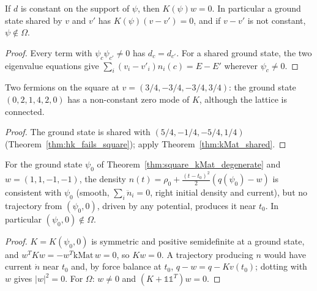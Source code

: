 \begin{theorem}
  \label{thm:kMat_shared}
  \leanok
  If $d$ is constant on the support of $\psi$, then $K(\psi)w=0$. In particular a ground state shared by $v$
  and $v'$ has $K(\psi)(v-v')=0$, and if $v-v'$ is not constant, $\psi\notin\Omega$.
\end{theorem}
\begin{proof}
  \leanok
  Every term with $\psi_c\psi_{c'}\ne0$ has $d_c=d_{c'}$. For a shared ground state, the two eigenvalue
  equations give $\sum_i(v_i-v'_i)n_i(c)=E-E'$ wherever $\psi_c\ne0$.
\end{proof}

\begin{theorem}
  \label{thm:square_kMat_degenerate}
  \leanok
  Two fermions on the square at $v=(3/4,-3/4,-3/4,3/4)$: the ground state $(0,2,1,4,2,0)$ has a non-constant
  zero mode of $K$, although the lattice is connected.
\end{theorem}
\begin{proof}
  \leanok
  The ground state is shared with $(5/4,-1/4,-5/4,1/4)$ (Theorem~\ref{thm:hk_fails_square}); apply
  Theorem~\ref{thm:kMat_shared}.
\end{proof}

\begin{theorem}
  \label{thm:ft_theorem2_counterexample}
  \leanok
  For the ground state $\psi_0$ of Theorem~\ref{thm:square_kMat_degenerate} and $w=(1,1,-1,-1)$, the density
  $n(t)=\rho_0+\frac{(t-t_0)^2}2(q(\psi_0)-w)$ is consistent with $\psi_0$ (smooth, $\sum_i\ddot n_i=0$, right initial
  density and current), but no trajectory from $(\psi_0,0)$, driven by any potential, produces it near $t_0$. In
  particular $(\psi_0,0)\notin\Omega$.
\end{theorem}
\begin{proof}
  \leanok
  $K=K(\psi_0,0)$ is symmetric and positive semidefinite at a ground state, and $w^TKw=-w^T\mathrm{kMat}\,w=0$, so
  $Kw=0$. A trajectory producing $n$ would have current $\dot n$ near $t_0$ and, by force balance at $t_0$,
  $q-w=q-Kv(t_0)$; dotting with $w$ gives $|w|^2=0$. For $\Omega$: $w\ne0$ and $(K+\mathbb 1\mathbb 1^T)w=0$.
\end{proof}

